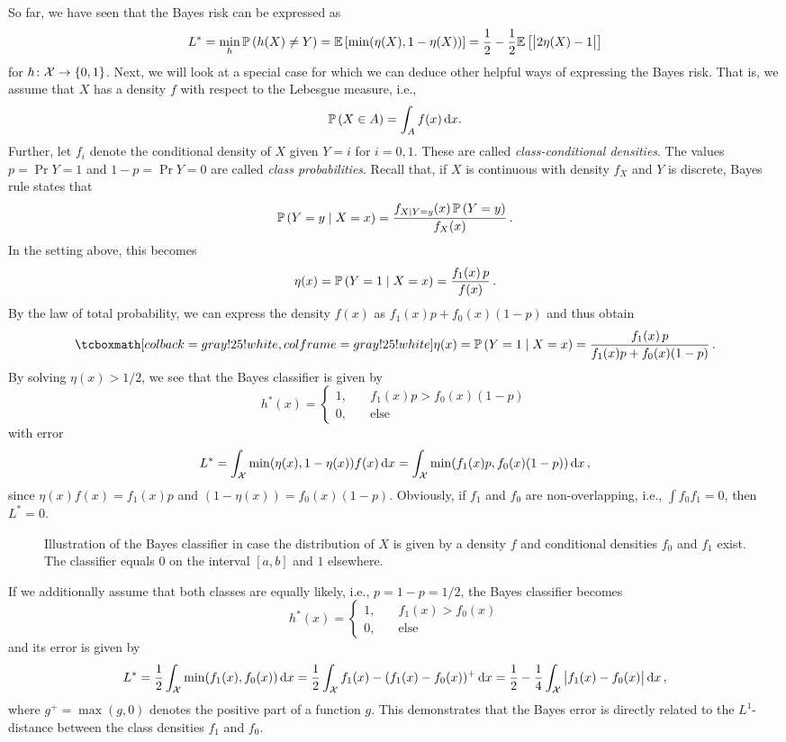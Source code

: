 So far, we have seen that the Bayes risk can be expressed as
\[
    L^* = \min_h \mathbb{P}\left(h(X) \neq Y\right) = \mathbb{E}\left[\min(\eta(X), 1-\eta(X))\right] = \frac{1}{2} - \frac{1}{2} \mathbb{E}\left[\big\lvert 2\eta(X) - 1 \big\rvert\right]
\]
for $h \colon \mathcal{X} \to \left\{0, 1\right\}$. Next, we will look at a special case for which we can deduce other helpful ways of expressing the Bayes risk. That is, we assume that $X$ has a density $f$ with respect to the Lebesgue measure, i.e.,
\[
    \mathbb{P}\left(X \in A\right) = \int_A f(x) \,\mathrm{d}x.
\]
Further, let $f_i$ denote the conditional density of $X$ given $Y = i$ for $i = 0, 1$. These are called \emph{class-conditional densities}. The values $p = \Pr{Y = 1}$ and $1 - p = \Pr{Y = 0}$ are called \emph{class probabilities}. Recall that, if $X$ is continuous with density $f_X$ and $Y$ is discrete, Bayes rule states that
\[
    \mathbb{P}\left(Y=y \mathrel{|} X=x\right) = \frac{f_{X \mathrel{|} Y=y}(x) \, \mathbb{P}\left(Y=y\right)}{f_X(x)} \, .
\]
In the setting above, this becomes
\[
    \eta(x) = \mathbb{P}\left(Y=1 \mathrel{|} X=x\right) = \frac{f_1(x) \, p}{f(x)} \, .
\]
By the law of total probability, we can express the density $f(x)$ as $f_1(x)p + f_0(x)(1-p)$ and thus obtain
\begin{equation}
    \highlightMath{
        \eta(x) = \Pr{Y=1 \given X=x} = \frac{f_1(x) \, p}{f_1(x)p + f_0(x)(1-p)} \, .
    }
\end{equation}
By solving $\eta(x) > 1/2$, we see that the Bayes classifier is given by
\begin{equation}
\label{eq: bayes classifier for X with density}
    h^*(x) = \begin{cases}
        1, \quad & f_1(x)p > f_0(x)(1-p) \\
        0, \quad &\text{else}
    \end{cases}
\end{equation}
with error
\[
    L^* = \int_{\mathcal{X}} \min(\eta(x), 1-\eta(x)) f(x) \,\mathrm{d}x = \int_{\mathcal{X}} \min(f_1(x)p, f_0(x)(1-p)) \,\mathrm{d}x \, ,
\]
since $\eta(x)f(x) = f_1(x)p$ and $(1-\eta(x)) = f_0(x)(1-p)$. Obviously, if $f_1$ and $f_0$ are non-overlapping, i.e., $\int f_0 f_1 = 0$, then $L^* = 0$.
\begin{figure}
    \centering
    \resizebox{9cm}{!}{}
    \caption{%
        Illustration of the Bayes classifier in case the distribution of $X$ is given by a density $f$ and conditional densities $f_0$ and $f_1$ exist. The classifier equals $0$ on the interval $[a, b]$ and $1$ elsewhere.
    }
\end{figure}
If we additionally assume that both classes are equally likely, i.e., $p = 1-p = 1/2$, the Bayes classifier becomes
\[
    h^*(x) = \begin{cases}
        1, \quad & f_1(x) > f_0(x) \\
        0, \quad &\text{else}
    \end{cases}
\]
and its error is given by
\[
    L^* = \frac{1}{2} \int_{\mathcal{X}} \min(f_1(x), f_0(x)) \,\mathrm{d}x = \frac{1}{2} \int_{\mathcal{X}} f_1(x) - (f_1(x) - f_0(x))^+ \,\mathrm{d}x = \frac{1}{2} - \frac{1}{4} \int_{\mathcal{X}} \big\lvert f_1(x) - f_0(x) \big\rvert \,\mathrm{d}x \, ,
\]
where $g^+ = \max(g, 0)$ denotes the positive part of a function $g$. This demonstrates that the Bayes error is directly related to the $L^1$-distance between the class densities $f_1$ and $f_0$.
